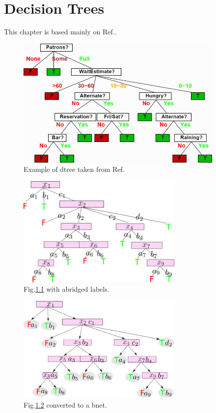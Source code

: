 \chapter{Decision Trees}\label{ch-dtree}
This chapter is based 
mainly on Ref.\cite{stu-nor-book}.

\begin{figure}[h!]
\centering
\includegraphics[width=4in]
{dtree/dtree-waiting.png}
\caption{Example of dtree taken from Ref.\cite{stu-nor-book}} 
\label{fig-dtree-waiting}
\end{figure}


\begin{figure}[h!]
\centering
\includegraphics[width=3.2in]
{dtree/dtree-waiting-labels.png}
\caption{Fig.\ref{fig-dtree-waiting} with
abridged labels.} 
\label{fig-dtree-waiting-labels}
\end{figure}

\begin{figure}[h!]
\centering
\includegraphics[width=3.2in]
{dtree/dtree-waiting-dags.png}
\caption{Fig.\ref{fig-dtree-waiting-labels}
converted to a bnet.} 
\label{fig-dtree-waiting-dags}
\end{figure}

